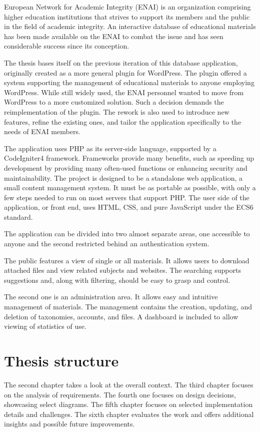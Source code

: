 \documentclass[
  digital,     %
  oneside,     %
  nosansbold,  %
  colorbold, %
  lof,         %
  lot,         %
]{fithesis4}
\begin{document}
European Network for Academic Integrity (ENAI) is an organization comprising
higher education institutions that strives to support its members and the public
in the field of academic integrity. An interactive database of educational
materials has been made available on the ENAI to combat the issue and has seen
considerable success since its conception.

The thesis bases itself on the previous iteration of this database application,
originally created as a more general plugin for WordPress. The plugin offered
a system supporting the management of educational materials to anyone employing
WordPress. While still widely used, the ENAI personnel wanted to move from
WordPress to a more customized solution. Such a decision demands the
reimplementation of the plugin. The rework is also used to introduce new
features, refine the existing ones, and tailor the application specifically to
the needs of ENAI members.

The application uses PHP as its \mbox{server-side} language, supported by a CodeIgniter4
framework. Frameworks provide many benefits, such as speeding up development by
providing many \mbox{often-used} functions or enhancing security and maintainability.
The project is designed to be a standalone web application, a small content
management system. It must be as portable as possible, with only a few steps
needed to run on most servers that support PHP. The user side of the application,
or front end, uses HTML, CSS, and pure JavaScript under the ECS6 standard.

The application can be divided into two almost separate areas, one accessible to
anyone and the second restricted behind an authentication system.

The public features a view of single or all materials. It allows users to
download attached files and view related subjects and websites. The searching
supports suggestions and, along with filtering, should be easy to grasp and
control.

The second one is an administration area. It allows easy and intuitive management
of materials. The management contains the creation, updating, and deletion of
taxonomies, accounts, and files. A dashboard is included to allow viewing of
statistics of use.

\section{Thesis structure}

The second chapter takes a look at the overall context. The third chapter
focuses on the analysis of requirements. The fourth one focuses on design decisions,
showcasing select diagrams. The fifth chapter focuses on selected implementation
details and challenges. The sixth chapter evaluates the work and offers
additional insights and possible future improvements.
\end{document}
